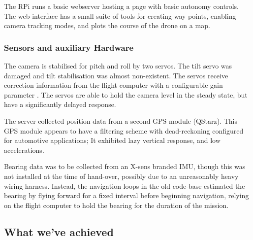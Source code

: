 \documentclass[a4paper, 11pt, titlepage]{article}
\begin{document}
      The RPi runs a basic webserver hosting a page with basic autonomy controls.  The web interface has a small suite of tools for creating way-points, enabling camera tracking modes, and plots the course of the drone on a map.

    \subsubsection{Sensors and auxiliary Hardware}
      The camera is stabilised for pitch and roll by two servos. The tilt servo was damaged and tilt stabilisation was almost non-existent.  The servos receive correction information from the flight computer with a configurable gain parameter \cite{manNAZA}.  The servos are able to hold the camera level in the steady state, but have a significantly delayed response.

      The server collected position data from a second GPS module (QStarz).  This GPS module appears to have a filtering scheme with dead-reckoning configured for automotive applications; It exhibited lazy vertical response, and low accelerations.

      Bearing data was to be collected from an X-sens branded IMU, though this was not installed at the time of hand-over, possibly due to an unreasonably heavy wiring harness.  Instead, the navigation loops in the old code-base estimated the bearing by flying forward for a fixed interval before beginning navigation, relying on the flight computer to hold the bearing for the duration of the mission.

  \subsection{What we've achieved}
\end{document}
